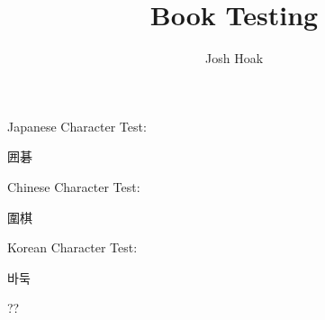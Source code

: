 \documentclass{book}
\newenvironment{Korean}{\CJKfamily{mj}}{}
\begin{document}
\title{Book Testing}
\author{Josh Hoak}
\maketitle

Japanese Character Test:
\begin{CJK}{UTF8}{min}
囲碁
\end{CJK}

Chinese Character Test:
\begin{CJK}{UTF8}{min}
圍棋
\end{CJK}

Korean Character Test:
\begin{CJK}{UTF8}{}
\begin{Korean}
바둑
\end{Korean}
\end{CJK}

{\gooa\char??}




\end{document}
